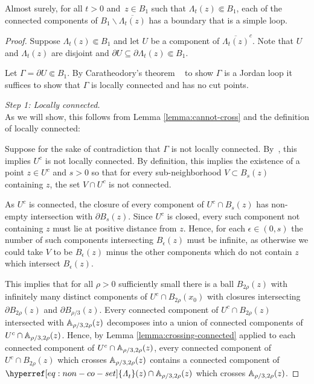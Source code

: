 \documentclass[12pt]{amsart}
\numberwithin{equation}{section}
\newcommand{\cluster}[2]{\hyperref[eq:non-co-set]{\mathit{\Lambda}^{#1}_{#2}}}
\begin{document}
	
	
	\begin{prop} \label{prop:boundary-simple-loop}
		Almost surely, for all $t > 0$ and~$z \in B_1$ such that ${\cluster{}{t}(z)} \Subset B_1$, each of the connected components of $B_1 \backslash \overline{{{\cluster{}{t}(z)}}}$
		has a boundary that is a simple loop.
	\end{prop}
	\begin{proof}
		
		Suppose ${\cluster{}{t}(z)} \Subset B_1$ and let $U$ be a component of ${\overline{{{\cluster{}{t}(z)}}}}^c$.
		Note that $U$ and ${\cluster{}{t}(z)}$ are disjoint and $\partial U \subseteq \partial {\cluster{}{t}(z)} \Subset B_1$.
		
		Let $\Gamma = \partial U \Subset B_1$. 
		By Caratheodory's theorem ~\cite[Theorem 2.6]{pommerenke2013boundary} to show $\Gamma$ is a Jordan loop
		it suffices to show that $\Gamma$ is locally connected and has no cut points. 
		
		{\it Step 1: Locally connected.} \\
		As we will show, this follows from Lemma \ref{lemma:cannot-cross} and the definition of locally connected:
		
		Suppose for the sake of contradiction that $\Gamma$ is not locally connected.
		By~\cite[Theorem 2.1]{pommerenke2013boundary}, this implies $U^c$ is not locally connected. 
		By definition, this implies the existence
		of a point $z \in U^c$ and $s > 0$ so that for every sub-neighborhood $V \subset B_{s}(z)$ containing 
		$z$, the set $V \cap U^c$ is not connected. 
		
		
		
		As $U^c$ is connected, the closure of every component of $U^c \cap B_s(z)$ has non-empty intersection with $\partial B_s(z)$. 
		Since $U^c$ is closed, every such component not containing $z$ must lie at positive distance from $z$.
		Hence, for each $\epsilon \in (0,s)$ the number of such components intersecting $B_\epsilon(z)$ must be infinite, as
		otherwise we could take $V$ to be $B_{\epsilon}(z)$ minus the other components which do not contain $z$ which intersect $B_{\epsilon}(z)$.
		
		This implies that for all $\rho > 0$ sufficiently small there is a ball $B_{2\rho}(z)$ with infinitely many distinct components of $U^c \cap B_{2 \rho}(x_0)$ with closures intersecting $\partial B_{2\rho}(z)$ and $\partial B_{\rho/3}(z)$. 
		Every connected component of $U^c \cap B_{2 \rho}(z)$ intersected with $\mathbb{A}_{\rho/3, 2 \rho}(z)$ decomposes into a union of connected components 
		of $U^c \cap \mathbb{A}_{\rho/3, 2 \rho}(z)$. Hence, by Lemma \ref{lemma:crossing-connected} applied to each connected
		component of $U^c \cap \mathbb{A}_{\rho/3, 2 \rho}(z)$, every connected component of $U^c \cap B_{2 \rho}(z)$ which crosses
		$\mathbb{A}_{\rho/3, 2 \rho}(z)$ contains a connected component of ${\cluster{}{t}(z)} \cap \A_{\rho/3, 2 \rho}(z)$ which crosses $\mathbb{A}_{\rho/3, 2 \rho}(z)$.
		

\end{proof}
\end{document}
